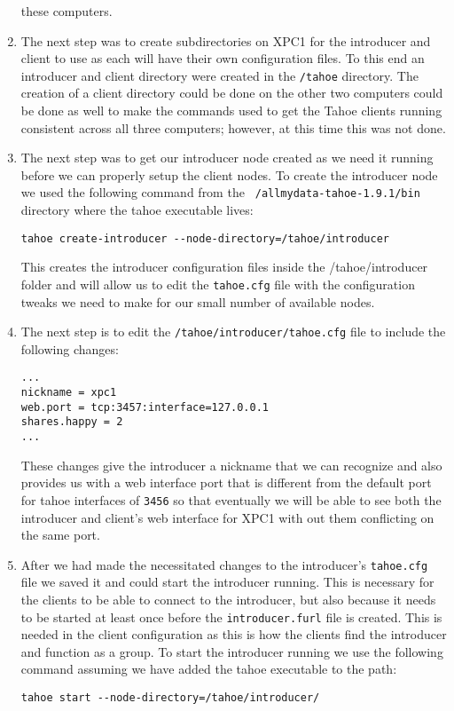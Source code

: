 \documentclass[11pt]{article}
\begin{document}
\begin{enumerate}
  these computers.
\item The next step was to create subdirectories on XPC1 for the
  introducer and client to use as each will have their own
  configuration files. To this end an introducer and client directory
  were created in the \texttt{/tahoe} directory. The creation of a client
  directory could be done on the other two computers could be done as
  well to make the commands used to get the Tahoe clients running
  consistent across all three computers; however, at this time this
  was not done.
\item The next step was to get our introducer node created as we need
  it running before we can properly setup the client nodes. To create
  the introducer node we used the following command from the
  \texttt{~/allmydata-tahoe-1.9.1/bin} directory where the tahoe executable
  lives: 
\begin{verbatim}
tahoe create-introducer --node-directory=/tahoe/introducer
\end{verbatim}
This creates the introducer configuration files inside the
/tahoe/introducer folder and will allow us to edit the \texttt{tahoe.cfg} file
with the configuration tweaks we need to make for our small number of
available nodes.
\item The next step is to edit the \texttt{/tahoe/introducer/tahoe.cfg} file to
  include the following changes:
\begin{verbatim}
...
nickname = xpc1
web.port = tcp:3457:interface=127.0.0.1
shares.happy = 2
...
\end{verbatim}

These changes give the introducer a nickname that we can recognize and
also provides us with a web interface port that is different from the
default port for tahoe interfaces of \texttt{3456} so that eventually we will
be able to see both the introducer and client's web interface for XPC1
with out them conflicting on the same port.

\item After we had made the necessitated changes to the introducer's
  \texttt{tahoe.cfg} file we saved it and could start the introducer
  running. This is necessary for the clients to be able to connect to
  the introducer, but also because it needs to be started at least
  once before the \texttt{introducer.furl} file is created. This is needed in
  the client configuration as this is how the clients find the
  introducer and function as a group. To start the introducer running
  we use the following command assuming we have added the tahoe
  executable to the path:
\begin{verbatim}
tahoe start --node-directory=/tahoe/introducer/
\end{verbatim}


\end{enumerate}
\end{document}
